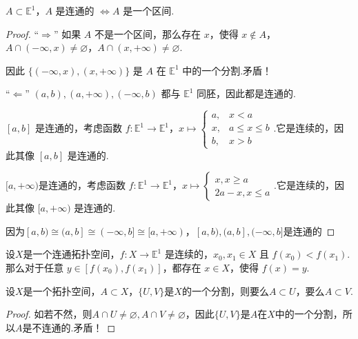 \begin{instance}
    $A \subset \mathbb{E}^1$，$A$ 是连通的 $\iff A$ 是一个区间.
\end{instance}
\begin{proof}
    “$\Rightarrow$” 如果 $A$ 不是一个区间，那么存在 $x$，使得 $x \notin A$，$A \cap (-\infty, x) \neq \varnothing$，$A \cap (x, +\infty) \neq \varnothing$.\par
    因此 $\{(-\infty, x), (x, +\infty)\}$ 是 $A$ 在 $\mathbb{E}^1$ 中的一个分割.矛盾！ \par
    “$\Leftarrow$” $(a, b), (a, +\infty), (-\infty, b)$ 都与 $\mathbb{E}^1$ 同胚，因此都是连通的.\par
    $[a, b]$ 是连通的，考虑函数 $f: \mathbb{E}^1 \to \mathbb{E}^1$，$x \mapsto \begin{cases} a, & x<a \\ x, & a \leq x \leq b \\ b, & x>b \end{cases}$.它是连续的，因此其像 $[a,b]$ 是连通的.\par
    $[a,+\infty)$是连通的，考虑函数 $f: \mathbb{E}^1 \to \mathbb{E}^1$，$x \mapsto \begin{cases}
        x , x\geq a\\
        2a-x,x\leq a
    \end{cases}$.它是连续的，因此其像 $[a,+\infty)$ 是连通的.\par
    因为$[a,b) \cong (a,b] \cong (-\infty,b] \cong [a, +\infty) $，$[a,b),(a,b],(-\infty,b]$是连通的
\end{proof}

\begin{theorem}[介值定理]
    设$X$是一个连通拓扑空间，$f: X \to \mathbb{E}^1$ 是连续的，$x_0, x_1 \in X$ 且 $f(x_0) < f(x_1)$.那么对于任意 $y \in [f(x_0), f(x_1)]$，都存在 $x \in X$，使得 $f(x) = y$.
\end{theorem}



\begin{lemma}
    设$X$是一个拓扑空间，$A\subset X$，$\{U,V\}$是$X$的一个分割，则要么$A\subset U$，要么$A\subset V$.
\end{lemma}
\begin{proof}
    如若不然，则$A\cap U \neq \varnothing,A\cap V \neq \varnothing$，因此$\{U,V\}$是$A$在$X$中的一个分割，所以$A$是不连通的.矛盾！
\end{proof}